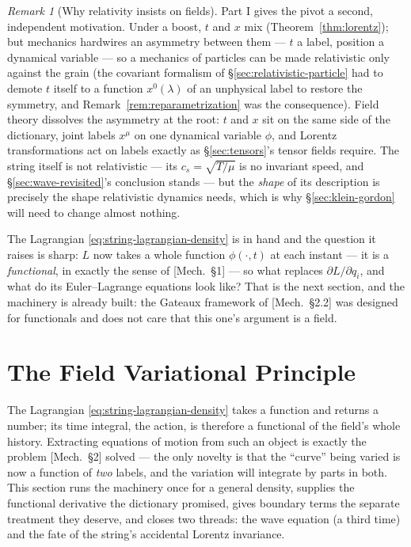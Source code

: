 \documentclass[11pt]{article}
\theoremstyle{plain}
\theoremstyle{definition}
\theoremstyle{remark}
\newtheorem{remark}[theorem]{Remark}
\begin{document}
\begin{remark}[Why relativity insists on fields]
\label{rem:relativity-insists}
Part I gives the pivot a second, independent motivation. Under a
boost, $t$ and $x$ mix (Theorem~\ref{thm:lorentz}); but mechanics
hardwires an asymmetry between them --- $t$ a label, position a
dynamical variable --- so a mechanics of particles can be made
relativistic only against the grain (the covariant formalism of
\S\ref{sec:relativistic-particle} had to demote $t$ itself to a
function $x^0(\lambda)$ of an unphysical label to restore the
symmetry, and Remark~\ref{rem:reparametrization} was the consequence). Field
theory dissolves the asymmetry at the root: $t$ and $x$ sit on the
same side of the dictionary, joint labels $x^\mu$ on one dynamical
variable $\phi$, and Lorentz transformations act on labels exactly as
\S\ref{sec:tensors}'s tensor fields require. The string itself is not
relativistic --- its $c_s = \sqrt{T/\mu}$ is no invariant speed, and
\S\ref{sec:wave-revisited}'s conclusion stands --- but the \emph{shape}
of its description is precisely the shape relativistic dynamics needs,
which is why \S\ref{sec:klein-gordon} will need to change almost
nothing.
\end{remark}

\noindent
The Lagrangian \eqref{eq:string-lagrangian-density} is in hand and the
question it raises is sharp: $L$ now takes a whole function
$\phi(\cdot, t)$ at each instant --- it is a \emph{functional}, in
exactly the sense of [Mech.\ \S1] --- so what replaces
$\partial L/\partial q_i$, and what do its Euler--Lagrange equations
look like? That is the next section, and the machinery is already
built: the Gateaux framework of [Mech.\ \S2.2] was designed for
functionals and does not care that this one's argument is a field.

\section{The Field Variational Principle}
\label{sec:field-variational}

The Lagrangian \eqref{eq:string-lagrangian-density} takes a function and
returns a number; its time integral, the action, is therefore a
functional of the field's whole history. Extracting equations of
motion from such an object is exactly the problem [Mech.\ \S2] solved
--- the only novelty is that the ``curve'' being varied is now a
function of \emph{two} labels, and the variation will integrate by
parts in both. This section runs the machinery once for a general
density, supplies the functional derivative the dictionary promised, gives
boundary terms the separate treatment they deserve, and closes two
threads: the wave equation (a third time) and the fate of the string's
accidental Lorentz invariance.
\end{document}
